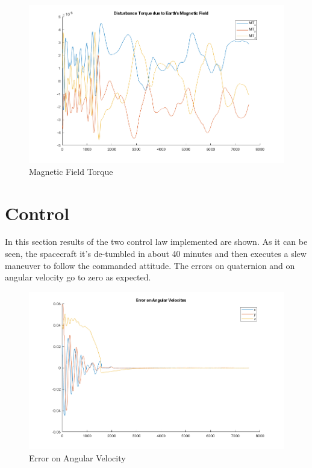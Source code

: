 \documentclass[11pt,a4paper]{report}
\begin{document}
\begin{figure}[H]
 \centering
 \includegraphics[scale=0.5]{gfx/results/magfield.png}
 \caption{Magnetic Field Torque} 
 \label{fig:magfieldtorque}
\end{figure}

\section{Control}
In this section results of the two control law implemented are shown.
As it can be seen, the spacecraft it's de-tumbled in about 40 minutes and then executes a slew maneuver to follow the commanded attitude. The errors on quaternion and on angular velocity go to zero as expected.

\begin{figure}[H]
 \centering
 \includegraphics[scale=0.5]{gfx/results/error_w.png}
 \caption{Error on Angular Velocity} 
\end{figure}
\end{document}
